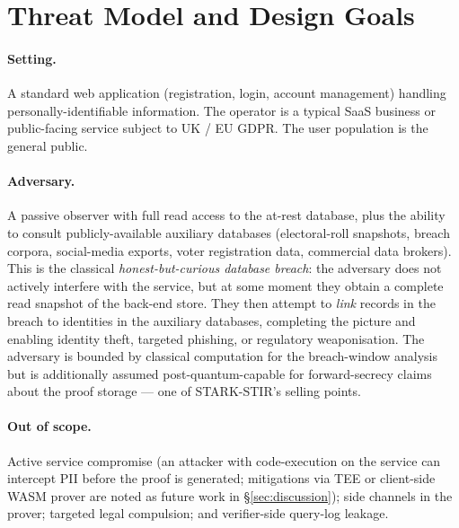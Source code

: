 \documentclass[11pt,a4paper]{article}
\begin{document}
\section{Threat Model and Design Goals}
\label{sec:threat}

\paragraph{Setting.}  A standard web application (registration,
login, account management) handling personally\nobreakdash-identifiable
information.  The operator is a typical SaaS business or
public\nobreakdash-facing service subject to UK / EU GDPR.  The
user population is the general public.

\paragraph{Adversary.}  A passive observer with full read access
to the at\nobreakdash-rest database, plus the ability to consult
publicly\nobreakdash-available auxiliary databases (electoral\nobreakdash-roll
snapshots, breach corpora, social\nobreakdash-media exports, voter
registration data, commercial data brokers).  This is the
classical \emph{honest\nobreakdash-but\nobreakdash-curious database breach}:
the adversary does not actively interfere with the service, but at
some moment they obtain a complete read snapshot of the back\nobreakdash-end
store.  They then attempt to \emph{link} records in the breach to
identities in the auxiliary databases, completing the picture and
enabling identity theft, targeted phishing, or regulatory weaponisation.
The adversary is bounded by classical computation for the
breach\nobreakdash-window analysis but is additionally assumed
post\nobreakdash-quantum\nobreakdash-capable for forward\nobreakdash-secrecy
claims about the proof storage — one of STARK\nobreakdash-STIR's selling
points.

\paragraph{Out of scope.}  Active service compromise (an attacker
with code\nobreakdash-execution on the service can intercept PII
before the proof is generated; mitigations via TEE or
client\nobreakdash-side WASM prover are noted as future work in
\S\ref{sec:discussion}); side channels in the prover; targeted
legal compulsion; and verifier\nobreakdash-side query\nobreakdash-log
leakage.
\end{document}
